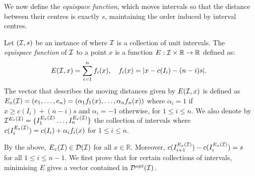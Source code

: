 %
%
We now define the \emph{equispace function}, which moves intervals so that the distance between their centres is exactly $s$, maintaining the order induced by interval centres.
%
\begin{definition}\label{def:tmd_equispace}
    Let $(\mathcal{I},s)$ be an instance of {\idisp} where $\mathcal{I}$ is a collection of unit intervals. The \emph{equispace function} of $\mathcal{I}$ to a point $x$ is a function $E: \mathcal{I}\times \mathbb{R} \rightarrow \mathbb{R}$ defined as:
    \begin{align*}
        E(\mathcal{I},x) = \sum_{i = 1}^n f_i(x),\quad f_i(x) = |x-c(I_i) - (n-i)s|.
    \end{align*}
    The vector that describes the moving distances given by $E(\mathcal{I},x)$ is defined as $E_x(\mathcal{I}) = (e_1,\ldots,e_n)= \left(\alpha_1 f_1(x),\ldots,\alpha_n f_n(x)\right)$ where $\alpha_i = 1$ if $x\ge c(I_i)+(n-i)s$ and $\alpha_i = -1$ otherwise, for $1\le i \le n$.
    We also denote by $\mathcal{I}^{E_x(\mathcal{I})} = \{I^{E_x(\mathcal{I})}_1\ldots, I^{E_x(\mathcal{I})}_{n}\}$ the collection of intervals where $c(I^{E_x(\mathcal{I})}_i) = c(I_i) +\alpha_if_i(x)$ for $1\le i \le n$.
\end{definition}
By the above, $E_x(\mathcal{I}) \in \mathcal{D}(\mathcal{I})$ for all $x \in \mathbb{R}$.
Moreover, $c(I^{E_x(\mathcal{I})}_{i+1}) - c(I^{E_x(\mathcal{I})}_{i}) = s$ for all $1 \le i \le n-1$.
We first prove that for certain collections of intervals, minimising $E$ gives a vector contained in $\mathcal{D}^{\mathit{opt}}(\mathcal{I})$.

